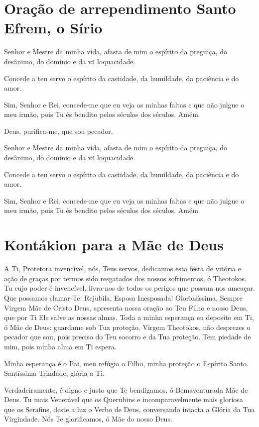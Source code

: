 \documentclass{subfiles}
\begin{document}
\section*{Oração de arrependimento Santo Efrem, o Sírio}

Senhor e Mestre da minha vida, afasta de mim o espírito da preguiça, do desânimo,
do domínio e da vã loquacidade.

Concede a teu servo o espírito da castidade, da humildade, da paciência e do amor.

Sim, Senhor e Rei, concede-me que eu veja as minhas faltas e que não julgue o meu
irmão, pois Tu és bendito pelos séculos dos séculos. Amém.

Deus, purifica-me, que sou pecador. 

Senhor e Mestre da minha vida, afasta de mim o espírito da preguiça, do desânimo,
do domínio e da vã loquacidade.

Concede a teu servo o espírito da castidade, da humildade, da paciência e do amor.

Sim, Senhor e Rei, concede-me que eu veja as minhas faltas e que não julgue o meu
irmão, pois Tu és bendito pelos séculos dos séculos. Amém.

\section*{Kontákion para a Mãe de Deus}

A Ti, Protetora invencível, nós, Teus servos, dedicamos esta festa de vitória e
ação de graças por termos sido resgatados dos nossos sofrimentos, ó Theotokos.
Tu cujo poder é invencível, livra-nos de todos os perigos que possam nos
ameaçar. Que possamos clamar-Te: Rejubila, Esposa Inesposada! Gloriosíssima,
Sempre Virgem Mãe de Cristo Deus, apresenta nossa oração ao Teu Filho e nosso
Deus, que por Ti Ele salve as nossas almas. Toda a minha esperança eu deposito
em Ti, ó Mãe de Deus: guardame sob Tua proteção. Virgem Theotokos, não desprezes
o pecador que sou, pois preciso do Teu socorro e da Tua proteção. Tem piedade de
mim, pois minha alma em Ti espera.

Minha esperança é o Pai, meu refúgio o Filho, minha proteção o Espírito Santo.
Santíssima Trindade, glória a Ti.

Verdadeiramente, é digno e justo que Te bendigamos, ó Bemaventurada Mãe de Deus.
Tu mais Venerável que os Querubins e incomparavelmente mais gloriosa que os
Serafins, deste a luz o Verbo de Deus, conversando intacta a Glória da Tua
Virgindade. Nós Te glorificamos, ó Mãe do nosso Deus.
\end{document}
